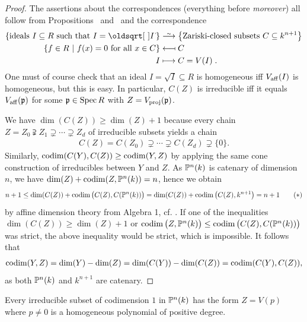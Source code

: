 \documentclass[a4paper,parskip=half,numbers=enddot, DIV=12]{scrreprt}
\begin{document}
\begin{proof}
The assertions about the correspondences (everything before \emph{moreover}) all follow from Propositions~
and~ and the correspondence
\begin{align*}
\left\{\text{ideals }I\subseteq R\text{ such that }I=\sqrt I\right\}&\isomorphism\left\{\text{Zariski-closed subsets }C\subseteq k^{n+1}\right\}\\
\left\{f\in R\st f(x)=0\text{ for all }x\in C\right\} &\longmapsfrom C\\
I&\longmapsto C=V(I)\;.
\end{align*}
One must of course check that an ideal $I=\sqrt I\subseteq R$ is homogeneous iff $V_{\mathrm{aff}}(I)$ is homogeneous, but this is easy. In particular, $C(Z)$ is irreducible iff it equals $V_{\mathrm{aff}}(\mathfrak{p})$ for some $\mathfrak{p} \in \operatorname{Spec} R$ with $Z=V_{\mathrm{proj}}(\mathfrak{p})$.

We have $\dim(C(Z))\geq \dim(Z)+1$ because every chain $Z = Z_0 \supsetneqq Z_1\supsetneq \cdots\supsetneq Z_d$
of irreducible subsets yields a chain
\begin{align*}
C(Z) = C(Z_0) \supsetneq \cdots\supsetneq C(Z_d)\supsetneq \{0\}.
\end{align*}
Similarly, $\operatorname{codim}(C(Y),C(Z)) \geq \operatorname{codim}(Y,Z)$ by applying the same cone construction of irreducibles between $Y$ and $Z$.
As $\mathbb{P}^n(k)$ is catenary of dimension $n$, we have $\dim(Z) + \operatorname{codim}(Z,\mathbb{P}^n(k)) = n$, hence we obtain
\begin{align}\lbl{eq:proofAffineConeCorrespondenceAst}
n+1\leq \dim(C(Z)) + \codim\big(C(Z),C(\IP^n(k))\big) = \dim(C(Z)) + \codim\big(C(Z),k^{n+1}\big)
= n+1\tag{$\ast$}
\end{align}
by affine dimension theory from Algebra 1, cf. \cite[Theorem~5]{alg1}.
If one of the inequalities $\dim(C(Z))\geq \dim(Z)+1$ or $\operatorname{codim}\big(Z,\mathbb{P}^n(k)\big) \leq \operatorname{codim}\big(C(Z), C(\mathbb{P}^n(k))\big)$ was strict,
the above inequality  would be strict, which is impossible. It follows that
\begin{align*}
\operatorname{codim}(Y,Z) = \dim(Y)-\dim(Z) = \dim(C(Y)) - \dim(C(Z)) = \operatorname{codim}(C(Y),C(Z)),
\end{align*}
as both $\mathbb{P}^n(k)$ and $k^{n+1}$ are catenary.
\end{proof}
\begin{cor}
Every irreducible %
subset of codimension $1$ in $\mathbb{P}^n(k)$ has the form $Z = V(p)$ where $p\neq 0$ is a homogeneous polynomial of positive degree.
\end{cor}
\end{document}

